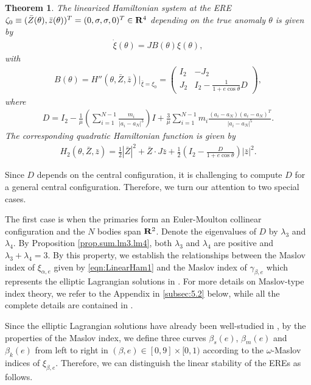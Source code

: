 \documentclass[11pt]{article}
\newtheorem{theorem}[lemma]{Theorem}
\def\bea{\begin{eqnarray}}
\def\eea{\end{eqnarray}}
\def\lb{\label}
\def\R{{\bf R}}
\def\aa{{\alpha}}
\def\bb{{\beta}}
\def\ga{{\gamma}}
\def\th{{\theta}}
\def\om{{\omega}}
\def\lm{{\lambda}}
\begin{document}
\begin{theorem}\label{linearized.Hamiltonian}
The linearized Hamiltonian system 
at the ERE
  $\zeta_0 \equiv (\bar{Z}(\theta),\bar{z}(\theta))^T =
  (0,\sigma,\sigma,0)^T\in\R^4  $
  depending on the true anomaly $\theta$ is given by
  \begin{align}
    \dot\xi(\theta) = JB(\theta)\xi(\theta),  \lb{eqn:LinearHam1}
  \end{align}
  with
  \bea B(\theta)
  = H''(\theta,\bar{Z},\bar{z})|_{\bar\xi=\xi_0}
  = \left(\begin{array}{cccc|cccc}
  I_2   &-J_2 \\
  J_2     &I_2-\frac{1}{1+e\cos\th}D
  \end{array}\right),  \lb{LinearHam2}\eea
  where
  \begin{align}
    \label{matrix.D}
  D=I_2-\frac{1}{\mu}\left(\sum_{i=1}^{N-1}
  \frac{m_i}{|a_i-a_{N}|^3}\right)I
  +\frac{3}{\mu}\sum_{i=1}^{N-1} m_i\frac{(a_i-a_{N})(a_i-a_{N})^T}{|a_i-a_{N}|^5}.
  \end{align}
  The corresponding quadratic Hamiltonian function is given by
  \bea
  H_2(\theta,\bar{Z},\bar{z})  
   =\frac{1}{2}|\bar{Z}|^2+\bar{Z}\cdot J\bar{z}
    +\frac{1}{2}\left(I_2-\frac{D}{1+e\cos\th}\right)|\bar{z}|^2. \eea
  \end{theorem}

Since $D$ depends on the central configuration,
it is challenging to compute $D$ for a general central configuration.
Therefore, we turn our attention to two special cases.
  
The first case is when the primaries form an Euler-Moulton collinear configuration and the $N$ bodies span $\R^2$.
Denote the eigenvalues of $D$ by $\lm_3$ and $\lm_4$. By Proposition  \ref{prop.sum.lm3.lm4}, both $\lm_3$ and $\lm_4$ are positive and  $\lm_3 + \lm_4 = 3$.
By this property, we establish the relationships between the Maslov index of $\xi_{\aa, e}$ given by \eqref{eqn:LinearHam1} and the Maslov index of $\ga_{\beta, e}$ which represents the elliptic Lagrangian solutions in \cite{HLS}. 
For more details on Maslov-type index theory, we refer to the Appendix in \ref{subsec:5.2} below, while all the complete details are contained in \cite{Lon4}.


Since the elliptic Lagrangian solutions have already been well-studied in \cite{HLS},
by the properties of the Maslov index, we define three curves $\bb_s(e)$, $\bb_m(e)$ and $\bb_k(e)$ from left to right in $(\bb, e)\in [0,9]\times [0, 1)$ according to the $\omega$-Maslov indices of $\xi_{\bb,e}$. 
Therefore, we can distinguish the linear stability
of the EREs as follows.
\end{document}
